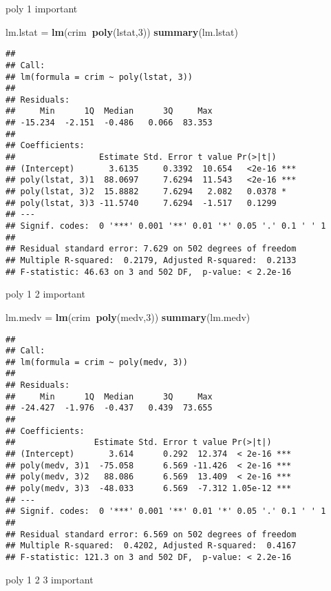 \documentclass[]{article}
\newenvironment{Shaded}{\begin{snugshade}}{\end{snugshade}}
\newcommand{\DecValTok}[1]{\textcolor[rgb]{0.00,0.00,0.81}{#1}}
\newcommand{\KeywordTok}[1]{\textcolor[rgb]{0.13,0.29,0.53}{\textbf{#1}}}
\newcommand{\NormalTok}[1]{#1}
\newcommand{\OperatorTok}[1]{\textcolor[rgb]{0.81,0.36,0.00}{\textbf{#1}}}
\newcommand{\StringTok}[1]{\textcolor[rgb]{0.31,0.60,0.02}{#1}}
\begin{document}
poly 1 important

\begin{Shaded}
\begin{Highlighting}[]
\NormalTok{lm.lstat =}\StringTok{ }\KeywordTok{lm}\NormalTok{(crim}\OperatorTok{~}\KeywordTok{poly}\NormalTok{(lstat,}\DecValTok{3}\NormalTok{))}
\KeywordTok{summary}\NormalTok{(lm.lstat)}
\end{Highlighting}
\end{Shaded}

\begin{verbatim}
## 
## Call:
## lm(formula = crim ~ poly(lstat, 3))
## 
## Residuals:
##     Min      1Q  Median      3Q     Max 
## -15.234  -2.151  -0.486   0.066  83.353 
## 
## Coefficients:
##                 Estimate Std. Error t value Pr(>|t|)    
## (Intercept)       3.6135     0.3392  10.654   <2e-16 ***
## poly(lstat, 3)1  88.0697     7.6294  11.543   <2e-16 ***
## poly(lstat, 3)2  15.8882     7.6294   2.082   0.0378 *  
## poly(lstat, 3)3 -11.5740     7.6294  -1.517   0.1299    
## ---
## Signif. codes:  0 '***' 0.001 '**' 0.01 '*' 0.05 '.' 0.1 ' ' 1
## 
## Residual standard error: 7.629 on 502 degrees of freedom
## Multiple R-squared:  0.2179, Adjusted R-squared:  0.2133 
## F-statistic: 46.63 on 3 and 502 DF,  p-value: < 2.2e-16
\end{verbatim}

poly 1 2 important

\begin{Shaded}
\begin{Highlighting}[]
\NormalTok{lm.medv =}\StringTok{ }\KeywordTok{lm}\NormalTok{(crim}\OperatorTok{~}\KeywordTok{poly}\NormalTok{(medv,}\DecValTok{3}\NormalTok{))}
\KeywordTok{summary}\NormalTok{(lm.medv)}
\end{Highlighting}
\end{Shaded}

\begin{verbatim}
## 
## Call:
## lm(formula = crim ~ poly(medv, 3))
## 
## Residuals:
##     Min      1Q  Median      3Q     Max 
## -24.427  -1.976  -0.437   0.439  73.655 
## 
## Coefficients:
##                Estimate Std. Error t value Pr(>|t|)    
## (Intercept)       3.614      0.292  12.374  < 2e-16 ***
## poly(medv, 3)1  -75.058      6.569 -11.426  < 2e-16 ***
## poly(medv, 3)2   88.086      6.569  13.409  < 2e-16 ***
## poly(medv, 3)3  -48.033      6.569  -7.312 1.05e-12 ***
## ---
## Signif. codes:  0 '***' 0.001 '**' 0.01 '*' 0.05 '.' 0.1 ' ' 1
## 
## Residual standard error: 6.569 on 502 degrees of freedom
## Multiple R-squared:  0.4202, Adjusted R-squared:  0.4167 
## F-statistic: 121.3 on 3 and 502 DF,  p-value: < 2.2e-16
\end{verbatim}

poly 1 2 3 important
\end{document}
